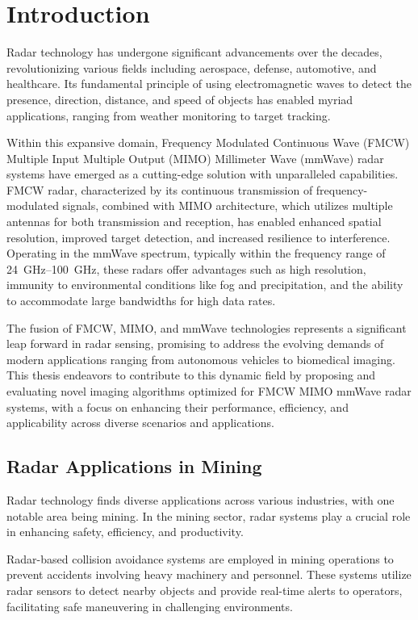 \chapter{Introduction}
\label{ch:intro}

Radar technology has undergone significant advancements over the decades,
revolutionizing various fields including aerospace, defense, automotive, and healthcare.
Its fundamental principle of using electromagnetic waves to detect the presence,
direction, distance, and speed of objects has enabled myriad applications, ranging from weather monitoring to target tracking.

Within this expansive domain, Frequency Modulated Continuous Wave (FMCW)
Multiple Input Multiple Output (MIMO) Millimeter Wave (mmWave) radar systems have emerged
as a cutting-edge solution with unparalleled capabilities.
FMCW radar, characterized by its continuous transmission of frequency-modulated signals,
combined with MIMO architecture, which utilizes multiple antennas for both transmission and reception,
has enabled enhanced spatial resolution, improved target detection, and increased resilience to interference.
Operating in the mmWave spectrum, typically within the frequency range of \SIrange{24}{100}{\GHz},
these radars offer advantages such as high resolution, immunity to environmental conditions
like fog and precipitation, and the ability to accommodate large bandwidths for high data rates.

The fusion of FMCW, MIMO, and mmWave technologies represents a significant leap forward in radar sensing,
promising to address the evolving demands of modern applications ranging from autonomous vehicles to biomedical imaging.
This thesis endeavors to contribute to this dynamic field by proposing and evaluating
novel imaging algorithms optimized for FMCW MIMO mmWave radar systems, with a focus on
enhancing their performance, efficiency, and applicability across diverse scenarios and applications. \\

\section{Radar Applications in Mining}
Radar technology finds diverse applications across various industries, with one notable area being mining.
In the mining sector, radar systems play a crucial role in enhancing safety, efficiency, and productivity.

Radar-based collision avoidance systems are employed in mining operations to prevent accidents involving heavy machinery and personnel.
These systems utilize radar sensors to detect nearby objects and provide real-time alerts to operators,
facilitating safe maneuvering in challenging environments.

